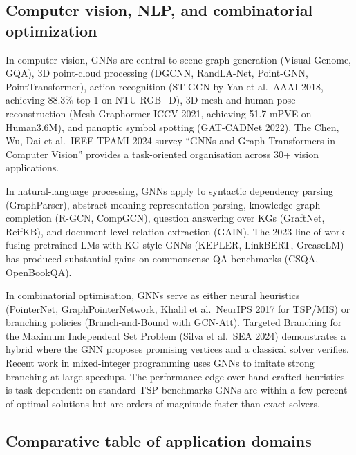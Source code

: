 \documentclass{article}
\begin{document}
\subsection{Computer vision, NLP, and combinatorial optimization}\label{computer-vision-nlp-and-combinatorial-optimization}

In computer vision, GNNs are central to scene-graph generation (Visual Genome, GQA), 3D point-cloud processing (DGCNN, RandLA-Net, Point-GNN, PointTransformer), action recognition (ST-GCN by Yan et al.~AAAI 2018, achieving 88.3\% top-1 on NTU-RGB+D), 3D mesh and human-pose reconstruction (Mesh Graphormer ICCV 2021, achieving 51.7 mPVE on Human3.6M), and panoptic symbol spotting (GAT-CADNet 2022). The Chen, Wu, Dai et al.~IEEE TPAMI 2024 survey ``GNNs and Graph Transformers in Computer Vision'' provides a task-oriented organisation across 30+ vision applications.

In natural-language processing, GNNs apply to syntactic dependency parsing (GraphParser), abstract-meaning-representation parsing, knowledge-graph completion (R-GCN, CompGCN), question answering over KGs (GraftNet, ReifKB), and document-level relation extraction (GAIN). The 2023 line of work fusing pretrained LMs with KG-style GNNs (KEPLER, LinkBERT, GreaseLM) has produced substantial gains on commonsense QA benchmarks (CSQA, OpenBookQA).

In combinatorial optimisation, GNNs serve as either neural heuristics (PointerNet, GraphPointerNetwork, Khalil et al.~NeurIPS 2017 for TSP/MIS) or branching policies (Branch-and-Bound with GCN-Att). Targeted Branching for the Maximum Independent Set Problem (Silva et al.~SEA 2024) demonstrates a hybrid where the GNN proposes promising vertices and a classical solver verifies. Recent work in mixed-integer programming uses GNNs to imitate strong branching at large speedups. The performance edge over hand-crafted heuristics is task-dependent: on standard TSP benchmarks GNNs are within a few percent of optimal solutions but are orders of magnitude faster than exact solvers.

\subsection{Comparative table of application domains}\label{comparative-table-of-application-domains}
\end{document}
